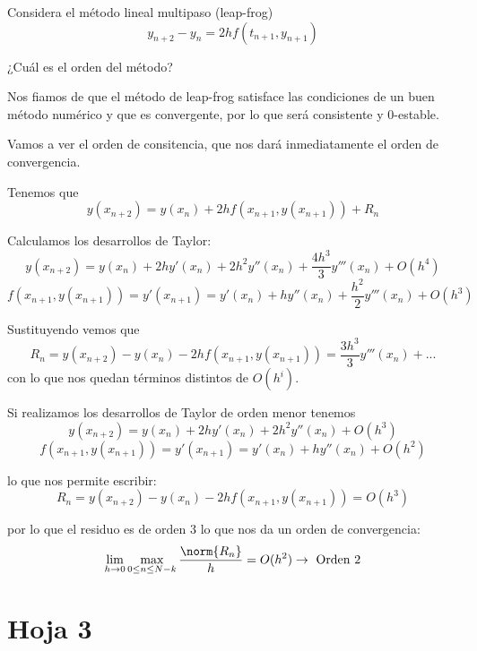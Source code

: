 \begin{problem}[6]
Considera el método lineal multipaso (leap-frog)
\[y_{n+2}-y_n = 2hf(t_{n+1},y_{n+1})\]

¿Cuál es el orden del método?
\solution
{}

Nos fiamos de que el método de leap-frog satisface las condiciones de un buen método numérico y que es convergente, por lo que será consistente y 0-estable.

Vamos a ver el orden de consitencia, que nos dará inmediatamente el orden de convergencia.

Tenemos que
\[y(x_{n+2}) = y(x_n)+2hf(x_{n+1},y(x_{n+1})) + R_n\]

Calculamos los desarrollos de Taylor:
\[y(x_{n+2}) = y(x_n)+2hy'(x_n)+2h^2y''(x_n)+\frac{4h^3}{3}y'''(x_n)+O(h^4)\]
\[f(x_{n+1},y(x_{n+1})) = y'(x_{n+1}) = y'(x_n)+hy''(x_n)+\frac{h^2}{2}y'''(x_n)+ O(h^3)\]

Sustituyendo vemos que
\[R_n = y(x_{n+2})-y(x_n)-2hf(x_{n+1},y(x_{n+1})) =  \frac{3h^3}{3}y'''(x_n)+ ... \]
con lo que nos quedan términos distintos de $O(h^i)$.

Si realizamos los desarrollos de Taylor de orden menor tenemos
\[y(x_{n+2}) = y(x_n)+2hy'(x_n)+2h^2y''(x_n)+O(h^3)\]
\[f(x_{n+1},y(x_{n+1})) = y'(x_{n+1}) = y'(x_n)+hy''(x_n) + O(h^2)\]

lo que nos permite escribir:
\[R_n = y(x_{n+2})-y(x_n)-2hf(x_{n+1},y(x_{n+1})) = O(h^3)\]

por lo que el residuo es de orden 3 lo que nos da un orden de convergencia:
\[\lim_{h \to 0} \max_{0 \leq n \leq N-k} \frac{\norm{R_n}}{h} = O(h^2) \to \text{ Orden 2}\]
\end{problem}

\section{Hoja 3}

